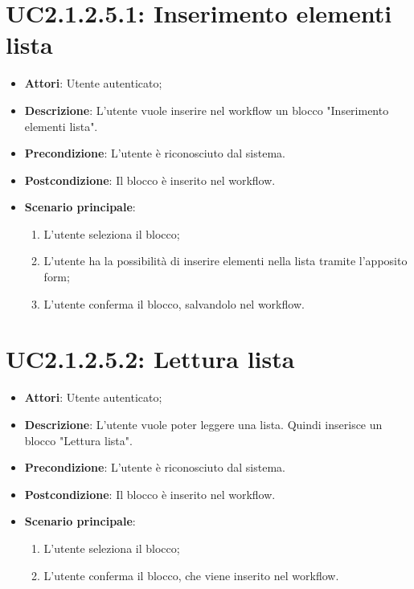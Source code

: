 \section{UC2.1.2.5.1: Inserimento elementi lista}
\label{UC2.1.2.5.1}
\begin{itemize}
	\item \textbf{Attori}: Utente autenticato;
	\item \textbf{Descrizione}: L'utente vuole inserire nel workflow un blocco "Inserimento elementi lista".
	\item \textbf{Precondizione}: L'utente è riconosciuto dal sistema.
	\item \textbf{Postcondizione}: Il blocco è inserito nel workflow.
	\item \textbf{Scenario principale}:
	\begin{enumerate} \item L'utente seleziona il blocco; \item L'utente ha la possibilità di inserire elementi nella lista tramite l'apposito form; \item L'utente conferma il blocco, salvandolo nel workflow.\end{enumerate}
\end{itemize}

\section{UC2.1.2.5.2: Lettura lista}
\label{UC2.1.2.5.2}
\begin{itemize}
	\item \textbf{Attori}: Utente autenticato;
	\item \textbf{Descrizione}: L'utente vuole poter leggere una lista. Quindi inserisce un blocco "Lettura lista".
	\item \textbf{Precondizione}: L'utente è riconosciuto dal sistema.
	\item \textbf{Postcondizione}: Il blocco è inserito nel workflow.
	\item \textbf{Scenario principale}:
	\begin{enumerate} \item L'utente seleziona il blocco;  \item  L'utente conferma il blocco, che viene inserito nel workflow.\end{enumerate}
\end{itemize}

